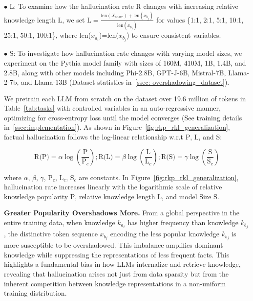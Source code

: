 \noindent$\bullet$ L: To examine how the hallucination rate $\text{R}$ changes 
with increasing relative knowledge length $\text{L}$, we set {\small$\text{L} = \frac{\text{len}(X_{\mathrm{share}})+\text{len}(x_{b_j})}{\text{len}(x_{b_j})}$} for values \{1:1, 2:1, 5:1, 10:1, 25:1, 50:1, 100:1\}, where len($x_{a_i}$)=len($x_{b_j}$) to ensure consistent variables.



\noindent$\bullet$ S: To investigate how hallucination rate changes with varying model sizes, we experiment on the Pythia model family with sizes of 160M, 410M, 1B, 1.4B, and 2.8B, along with other models including Phi-2.8B, GPT-J-6B, Mistral-7B, Llama-2-7b, and Llama-13B (Dataset statistics in~\ref{ssec: overshadowing_dataset}). 



We pretrain each LLM from scratch on the dataset over 19.6 million of tokens in Table~\ref{tab:tasks}
with controlled variables in an auto-regressive manner, optimizing for cross-entropy loss until the model converges (See training details in~\ref{ssec:implementation}). As shown in Figure~\ref{fig:rkp_rkl_generalization}, factual hallucination follows the log-linear relationship w.r.t $\text{P}$, $\text{L}$, and $\text{S}$:

\vspace{-0.4em}
\begin{small}
\begin{equation}
\text{R(P)}=\alpha\log(\frac{\text{P}}{\text{P}_c}); \text{R(L)}=\beta\log(\frac{\text{L}}{\text{L}_c}); \text{R(S)}=\gamma\log(\frac{\text{S}}{\text{S}_c})
\end{equation}
\end{small}



\vspace{0em}\noindent where $\alpha$, $\beta$, $\gamma$, $\text{P}_c$, $\text{L}_c$, $\text{S}_c$ are constants. In Figure~\ref{fig:rkp_rkl_generalization}, hallucination rate increases linearly with the logarithmic scale of relative knowledge popularity $\text{P}$, 
relative knowledge length $\text{L}$, and model Size $\text{S}$.

\vspace{1mm}
\noindent \textbf{Greater Popularity Overshadows More.}
From a global perspective in the entire training data, when knowledge $k_{a_i}$ has higher frequency than knowledge $k_{b_j}$, the distinctive token sequence $x_{b_j}$ encoding the less popular knowledge $k_{b_j}$ is more susceptible to be overshadowed.  This imbalance amplifies dominant knowledge while suppressing the representations of less frequent facts. 
This highlights a fundamental bias in how LLMs internalize and retrieve knowledge, revealing that hallucination arises not just from data sparsity but from the inherent competition between knowledge representations in a non-uniform training distribution.

